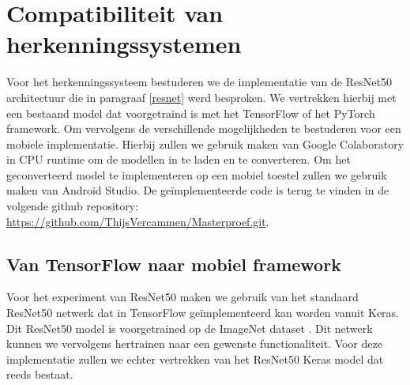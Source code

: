 \chapter{Compatibiliteit van herkenningssystemen}
Voor het herkenningssysteem bestuderen we de implementatie van de ResNet50 architectuur die in paragraaf \ref{resnet} werd besproken.
We vertrekken hierbij met een bestaand model dat voorgetraind is met het TensorFlow of het PyTorch framework.
Om vervolgens de verschillende mogelijkheden te bestuderen voor een mobiele implementatie.
Hierbij zullen we gebruik maken van Google Colaboratory in CPU runtime om de modellen in te laden en te converteren.
Om het geconverteerd model te implementeren op een mobiel toestel zullen we gebruik maken van Android Studio.
De ge\"implementeerde code is terug te vinden in de volgende github repository: \url{https://github.com/ThijsVercammen/Masterproef.git}.



\section{Van TensorFlow naar mobiel framework}
Voor het experiment van ResNet50 maken we gebruik van het standaard ResNet50 netwerk dat in TensorFlow ge\"implementeerd kan worden vanuit Keras.
Dit ResNet50 model is voorgetrained op de ImageNet dataset \cite{deng_2009_imagenet}. 
Dit netwerk kunnen we vervolgens hertrainen naar een gewenste functionaliteit.
Voor deze implementatie zullen we echter vertrekken van het ResNet50 Keras model dat reeds bestaat.

